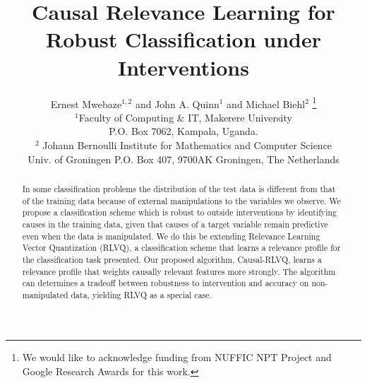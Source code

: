 \documentclass{esannV2}
\begin{document}
\title{Causal Relevance Learning for Robust Classification under Interventions}

\author{Ernest Mwebaze$^{1,2}$ and John A. Quinn$^1$ and Michael Biehl$^2$
%
\thanks{We would like to acknowledge funding from NUFFIC NPT Project and Google Research Awards for this work.}
%
\vspace{.3cm}\\
%
$^1$Faculty of Computing \& IT, Makerere University \\
P.O. Box 7062, Kampala, Uganda.%
\vspace{.1cm}\\
$^2$ Johann Bernoulli Institute for Mathematics and Computer Science \\
Univ. of Groningen P.O. Box 407, 9700AK Groningen, The Netherlands\\
}

\maketitle

\begin{abstract}
In some classification problems the distribution of the test data is different from that of the training data because of external manipulations to the variables we observe. We propose a classification scheme which is robust to outside interventions by identifying causes in the training data, given that causes of a target variable remain predictive even when the data is manipulated. We do this be extending Relevance Learning Vector Quantization (RLVQ), a classification scheme that learns a relevance profile for the classification task presented. Our proposed algorithm, Causal-RLVQ, learns a relevance profile that weights causally relevant features more strongly. The algorithm can determines a tradeoff between robustness to intervention and accuracy on non-manipulated data, yielding RLVQ as a special case.
\end{abstract}
\end{document}
